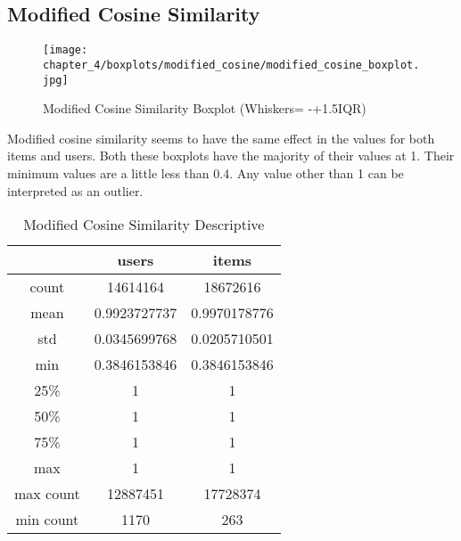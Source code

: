 \subsection{Modified Cosine Similarity}

\begin{figure}[H]
\centering
\texttt{[image: chapter\_4/boxplots/modified\_cosine/modified\_cosine\_boxplot.jpg]}
\caption{Modified Cosine Similarity Boxplot (Whiskers= -+1.5IQR)}
\label{figure:modified_cosine_similarity_boxplot}
\end{figure}

Modified cosine similarity seems to have the same effect in the values for both items
and users. Both these boxplots have the majority of their values at 1. Their minimum values
are a little less than 0.4. Any value other than 1 can be interpreted as an outlier.

\begin{table}[H]
\centering
\caption{Modified Cosine Similarity Descriptive}
\label{table:modified_cosine_similarity_descriptive}
\begin{tabular}{|c|c|c|}
\hline
          & \textbf{users} & \textbf{items} \\ \hline
count     & 14614164       & 18672616       \\ \hline
mean      & 0.9923727737   & 0.9970178776   \\ \hline
std       & 0.0345699768   & 0.0205710501   \\ \hline
min       & 0.3846153846   & 0.3846153846   \\ \hline
25\%      & 1              & 1              \\ \hline
50\%      & 1              & 1              \\ \hline
75\%      & 1              & 1              \\ \hline
max       & 1              & 1              \\ \hline
max count & 12887451       & 17728374       \\ \hline
min count & 1170           & 263            \\ \hline
\end{tabular}
\end{table}


